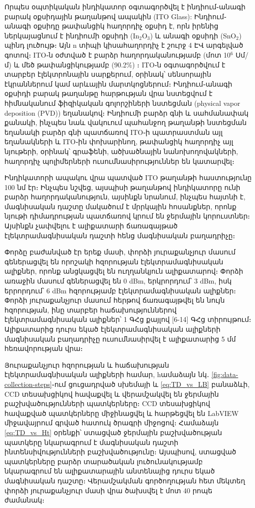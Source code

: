 \documentclass[12pt, fleqn]{report}
\begin{document}
Որպես օպտիկական ինդիկատոր օգտագործվել է ինդիում֊անագի բարակ օքսիդային թաղանթով ապակին (ITO Glass): Ինդիում֊անագի օքսիդը թափանցիկ հաղորդիչ օքսիդ է, որն իրենից ներկայացնում է ինդիումի օքսիդի (In$_2$O$_3$) և անագի օքսիդի (SnO$_2$) պինդ լուծույթ։ Այն n տիպի կիսահաղորդիչ է շուրջ 4 ԷՎ արգելված գոտով։ ITO֊ն օժտված է բարձր հաղորդականությամբ (մոտ 10$^6$ Սմ/մ) և մեծ թափանցիկությամբ (90.2\%) \cite{chen2013itofabcrication}։ ITO֊ն օգտագործվում է տարբեր էլեկտրոնային սարքերում, օրինակ՝ սենսորային էկրաններում կամ արևային մարտկոցներում։ Ինդիում֊անագի օքսիդի բարակ թաղանթը հարթության վրա նստեցվում է հիմնականում ֆիզիկական գոլորշիների նստեցման (physical vapor deposition (PVD)) եղանակով։ Ինդիումի բարձր գնի և սահմանափակ քանակի, ինչպես նաև վակուում պահանջող թաղանթի նստեցման եղանակի բարձր գնի պատճառով ITO֊ի պատրաստման այլ եղանակների և ITO֊ին փոխարինող, թափանցիկ հաղորդիչ այլ նյութերի, օրինակ՝ գրաֆենի, ածխածնային նանոխողովակների, հաղորդիչ պոլիմերների ուսումնասիրություններ են կատարվել։

Ինդիկատորի ապակու վրա պատված ITO թաղանթի հաստությունը 100 նմ էր։  Ինչպես նշվեց, այսպիսի թաղանթով ինդիկատորը ունի բարձր հաղորդականություն, այսինքն նրանում, ինչպես հայտնի է, մագնիսական դաշտը մակածում է մրրկային հոսանքներ, որոնք նյութի դիմադրության պատճառով կրում են ջերմային կորուստներ։ Այսինքն չափվելու է ալիքատարի ճառագայթած  էլեկտրամագնիսական դաշտի հենց մագնիսական բաղադրիչը։

Փորձը բաժանված էր երեք մասի, փորձի յուրաքանչյուր մասում գեներացվել են որոշակի հզորության էլեկտրամագնիսական ալիքներ, որոնք անցկացվել են ուղղանկյուն ալիքատարով։ Փորձի առաջին մասում գեներացվել են 0 dBm, երկրորդում՝ 3 dBm, իսկ երրորդում՝ 6 dBm հզորությամբ էլեկտրամագնիսական ալիքներ։ Փորձի յուրաքանչյուր մասում հերթով ճառագայթվել են նույն հզորության, ինը տարբեր հաճախություններով էլեկտրամագնիսական ալիքներ՝ 1 ԳՀց քայլով [6-14] ԳՀց տիրույթում։ Ալիքատարից դուրս եկած էլեկտրամագնիսական ալիքների մագնիսական բաղադրիչը ուսումնասիրվել է ալիքատարից 5 մմ հեռավորության վրա։

Յուրաքանչյուր հզորության և հաճախության էլեկտրամագնիսական ալիքների համար, hամաձայն նկ․ \ref{fig:data-collection-steps}֊ում ցուցադրված սխեմայի և \eqref{eq:TD_vs_LB} բանաձևի, CCD տեսախցիկով հավաքվել և վերամշակվել են ջերմային բաշխվածությունների պատկերները։ CCD տեսախցիկով հավաքված պատկերները միջինացվել և հարթեցվել են LabVIEW միջավայրում գրված հատուկ ծրագրի միջոցով։ Համաձայն \eqref{eq:TD_vs_Ht} օրենքի՝ ստացված ջերմային բաշխվածության պատկերը նկարագրում է մագնիսական դաշտի ինտենսիվությունների բաշխվածությունը։ Այսպիսով, ստացված պատկերները բարձր տարածական լուծունակությամբ նկարագրում են ալիքատարային անտենայից դուրս եկած մագնիսական դաշտը։ Վերամշակման գործողության հետ մեկտեղ փորձի յուրաքանչյուր մասի վրա ծախսվել է մոտ 40 րոպե ժամանակ։
\end{document}
